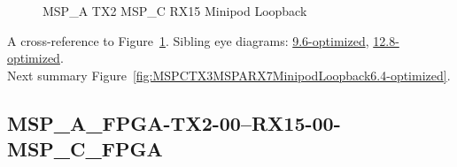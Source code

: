 \begin{figure}[h]
\begin{subfigure}{0.33\textwidth}
\hyperref[sec:MSPAFPGATX206RX1506MSPCFPGA6.4-optimized]{}
\end{subfigure}\hspace*{\fill}
\begin{subfigure}{0.33\textwidth}
\hyperref[sec:MSPAFPGATX207RX1507MSPCFPGA6.4-optimized]{}
\end{subfigure}\hspace*{\fill}
\begin{subfigure}{0.33\textwidth}
\hyperref[sec:MSPAFPGATX208RX1508MSPCFPGA6.4-optimized]{}
\end{subfigure}

\begin{subfigure}{0.33\textwidth}
\hyperref[sec:MSPAFPGATX209RX1509MSPCFPGA6.4-optimized]{}
\end{subfigure}\hspace*{\fill}
\begin{subfigure}{0.33\textwidth}
\hyperref[sec:MSPAFPGATX210RX1510MSPCFPGA6.4-optimized]{}
\end{subfigure}\hspace*{\fill}
\begin{subfigure}{0.33\textwidth}
\hyperref[sec:MSPAFPGATX211RX1511MSPCFPGA6.4-optimized]{}
\end{subfigure}

\caption{MSP\_A TX2 MSP\_C RX15 Minipod Loopback} \label{fig:MSPATX2MSPCRX15MinipodLoopback6.4-optimized}
\end{figure}

A cross-reference to Figure~\ref{fig:MSPATX2MSPCRX15MinipodLoopback6.4-optimized}.
Sibling eye diagrams: \hyperref[sec:MSPATX2MSPCRX15MinipodLoopback9.6-optimized]{9.6-optimized}, \hyperref[sec:MSPATX2MSPCRX15MinipodLoopback12.8-optimized]{12.8-optimized}. \\
Next summary Figure~\ref{fig:MSPCTX3MSPARX7MinipodLoopback6.4-optimized}.
\clearpage
% 
\subsection{MSP\_A\_FPGA-TX2-00--RX15-00-MSP\_C\_FPGA}\label{sec:MSPAFPGATX200RX1500MSPCFPGA6.4-optimized}

